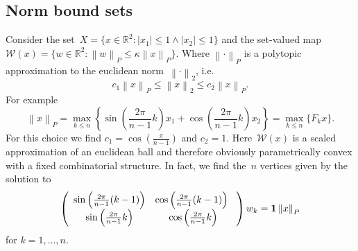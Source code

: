 \documentclass[final]{elsarticle}
\providecommand{\norm}[1]{\left\|#1\right\|}
\providecommand{\abs}[1]{\left|#1\right|}
\theoremstyle{remark}
\theoremstyle{definition}
\begin{document}
\subsection{Norm bound sets}\label{ssec:example:one}
%
Consider the set~$X = \{x\in\mathbb R^2: \abs{x_1}\leq 1\wedge \abs{x_2}\leq 1\}$ and the set-valued map $\mathcal W(x) = \{w\in\mathbb R^2: \norm{w}_P\leq\kappa\norm{x}_P\}$.
%
Where $\norm{\cdot}_P$ is a polytopic approximation to the euclidean norm~$\norm{\cdot}_2$, i.e.
%
$$
c_1 \norm{x}_P\leq\norm{x}_2\leq c_2\norm{x}_P.
$$
%
For example
%
$$
\norm{x}_P = \max_{k\leq n}\left\{\sin\left(\frac{2\pi}{n-1}k\right) x_1 + \cos\left(\frac{2\pi}{n-1}k\right) x_2\right\} = \max_{k\leq n}\{F_k x\}.
$$
%
For this choice we find $c_1 = \cos\left(\frac{\pi}{n-1}\right)$ and $c_2=1$.
%
Here~$\mathcal W(x)$ is a scaled approximation of an euclidean ball and therefore obviously parametrically convex with a fixed combinatorial structure.
%
In fact, we find the~$n$ vertices given by the solution to
%
$$
  \left(\begin{array}{cc}
  \sin\left(\frac{2\pi}{n-1}(k-1)\right) & \cos\left(\frac{2\pi}{n-1}(k-1)\right) \\
  \sin\left(\frac{2\pi}{n-1}k\right) & \cos\left(\frac{2\pi}{n-1}k\right)
  \end{array}
  \right) w_k = {\bf{1}}\norm{x}_P
$$
%
for $k=1,\dots,n$.
\end{document}
